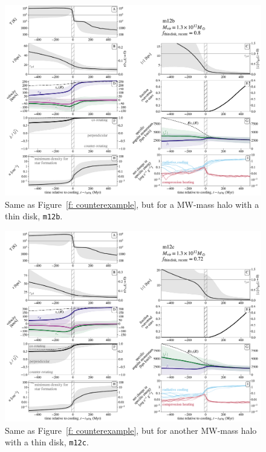 \documentclass[fleqn,usenatbib]{mnras}
\begin{document}
\begin{figure}
\includegraphics[width=\textwidth]{figures/before_and_after/before_and_after_allone_m12b_md.pdf}
\caption{
Same as Figure~\ref{f: counterexample}, but for a MW-mass halo with a thin disk, \texttt{m12b}.
}
\label{f: before and after m12b}
\end{figure}

\begin{figure}
\includegraphics[width=\textwidth]{figures/before_and_after/before_and_after_allone_m12c_md.pdf}
\caption{
Same as Figure~\ref{f: counterexample}, but for another MW-mass halo with a thin disk, \texttt{m12c}.
}
\label{f: before and after m12c}
\end{figure}
\end{document}
